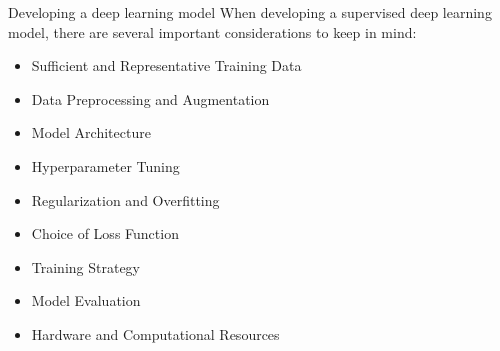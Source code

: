 \documentclass[10pt,aspectratio=169,dvipsnames]{beamer} %
\begin{document}
	\begin{frame}{Developing a deep learning model}
		When developing a supervised deep learning model, there are several important considerations to keep in mind:
		\begin{itemize}
			\item Sufficient and Representative Training Data
			\item Data Preprocessing and Augmentation
			\item Model Architecture
			\item Hyperparameter Tuning
			\item Regularization and Overfitting
			\item Choice of Loss Function
			\item Training Strategy
			\item Model Evaluation
			\item Hardware and Computational Resources	
		\end{itemize}
	\end{frame}
\end{document}
